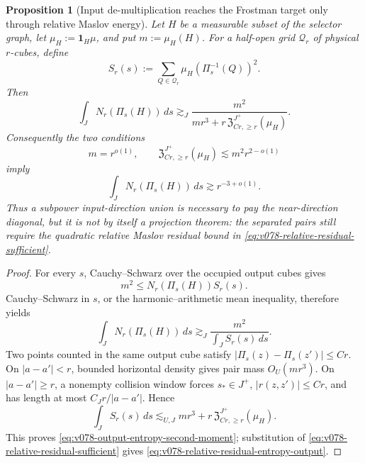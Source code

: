 \documentclass[10pt]{article}
\newtheorem{proposition}[theorem]{Proposition}
\begin{document}
\begin{proposition}[Input de-multiplication reaches the Frostman target only through relative Maslov energy]
\label{prop:v078-input-output-frostman-firewall}
Let \(H\) be a measurable subset of the selector graph, let
\(\mu_H:=\mathbf 1_H\mu\), and put \(m:=\mu_H(H)\).  For a half-open grid
\(\mathcal Q_r\) of physical \(r\)-cubes, define
\[
S_r(s)
:=
\sum_{Q\in\mathcal Q_r}
\mu_H(\Pi_s^{-1}(Q))^2.
\]
Then
\begin{equation}
\label{eq:v078-output-entropy-second-moment}
\boxed{
\int_JN_r(\Pi_s(H))\,ds
\gtrsim_J
\frac{m^2}
{mr^3+r\,\mathfrak Z_{Cr,\ge r}^{J^+}(\mu_H)}.
}
\end{equation}
Consequently the two conditions
\begin{equation}
\label{eq:v078-relative-residual-sufficient}
\boxed{
m=r^{o(1)},
\qquad
\mathfrak Z_{Cr,\ge r}^{J^+}(\mu_H)
\lesssim
m^2r^{2-o(1)}
}
\end{equation}
imply
\begin{equation}
\label{eq:v078-relative-residual-entropy-output}
\boxed{
\int_JN_r(\Pi_s(H))\,ds
\gtrsim
r^{-3+o(1)}.
}
\end{equation}
Thus a subpower input-direction union is necessary to pay the near-direction diagonal, but it is
not by itself a projection theorem: the separated pairs still require the quadratic relative
Maslov residual bound in \eqref{eq:v078-relative-residual-sufficient}.
\end{proposition}

\begin{proof}
For every \(s\), Cauchy--Schwarz over the occupied output cubes gives
\[
m^2
\le
N_r(\Pi_s(H))S_r(s).
\]
Cauchy--Schwarz in \(s\), or the harmonic--arithmetic mean inequality, therefore yields
\[
\int_JN_r(\Pi_s(H))\,ds
\gtrsim_J
\frac{m^2}{\int_JS_r(s)\,ds}.
\]
Two points counted in the same output cube satisfy
\(|\Pi_s(z)-\Pi_s(z')|\le Cr\).  On \(|a-a'|<r\), bounded horizontal density gives pair mass
\(O_U(mr^3)\).  On \(|a-a'|\ge r\), a nonempty collision window forces
\(s_*\in J^+\), \(|r(z,z')|\le Cr\), and has length at most
\(C_Jr/|a-a'|\).  Hence
\[
\int_JS_r(s)\,ds
\lesssim_{U,J}
mr^3+r\,\mathfrak Z_{Cr,\ge r}^{J^+}(\mu_H).
\]
This proves \eqref{eq:v078-output-entropy-second-moment}; substitution of
\eqref{eq:v078-relative-residual-sufficient} gives
\eqref{eq:v078-relative-residual-entropy-output}.
\end{proof}
\end{document}
